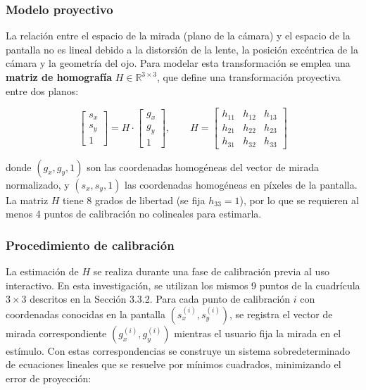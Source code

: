 \subsubsection{Modelo proyectivo}

La relación entre el espacio de la mirada (plano de la cámara) y el espacio de la pantalla no es lineal debido a la distorsión de la lente, la posición excéntrica de la cámara y la geometría del ojo. Para modelar esta transformación se emplea una \textbf{matriz de homografía} $H \in \mathbb{R}^{3 \times 3}$, que define una transformación proyectiva entre dos planos:

\begin{equation}
	\begin{bmatrix}
		s_x \\
		s_y \\
		1
	\end{bmatrix}
	=
	H \cdot
	\begin{bmatrix}
		g_x \\
		g_y \\
		1
	\end{bmatrix},
	\qquad
	H =
	\begin{bmatrix}
		h_{11} & h_{12} & h_{13} \\
		h_{21} & h_{22} & h_{23} \\
		h_{31} & h_{32} & h_{33}
	\end{bmatrix}
	\label{eq:homografia}
\end{equation}

donde $(g_x, g_y, 1)$ son las coordenadas homogéneas del vector de mirada normalizado, y $(s_x, s_y, 1)$ las coordenadas homogéneas en píxeles de la pantalla. La matriz $H$ tiene 8 grados de libertad (se fija $h_{33}=1$), por lo que se requieren al menos 4 puntos de calibración no colineales para estimarla.

\subsubsection{Procedimiento de calibración}

La estimación de $H$ se realiza durante una fase de calibración previa al uso interactivo. En esta investigación, se utilizan los mismos 9 puntos de la cuadrícula $3 \times 3$ descritos en la Sección 3.3.2. Para cada punto de calibración $i$ con coordenadas conocidas en la pantalla $(s_x^{(i)}, s_y^{(i)})$, se registra el vector de mirada correspondiente $(g_x^{(i)}, g_y^{(i)})$ mientras el usuario fija la mirada en el estímulo. Con estas correspondencias se construye un sistema sobredeterminado de ecuaciones lineales que se resuelve por mínimos cuadrados, minimizando el error de proyección:

